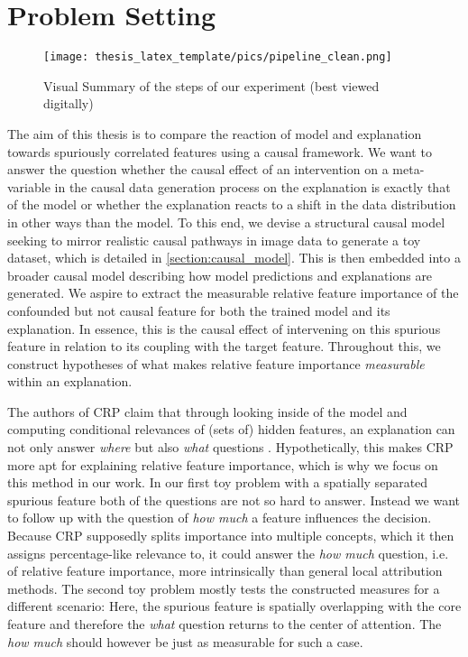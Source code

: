 \chapter{Problem Setting}\label{chapter:problem_setting}

\begin{figure}[t!]
    \advance\leftskip-2.3cm
    \texttt{[image: thesis\_latex\_template/pics/pipeline\_clean.png]}%
    \caption[Pipeline]{Visual Summary of the steps of our experiment (best viewed digitally)}
    \label{fig:pipeline}
\end{figure}

The aim of this thesis is to compare the reaction of model and explanation towards spuriously correlated features using a causal framework.
We want to answer the question whether the causal effect of an intervention on a meta-variable in the causal data generation process on the explanation is exactly that of the model or whether the explanation reacts to a shift in the data distribution in other ways than the model. 
To this end, we devise a structural causal model seeking to mirror realistic causal pathways in image data to generate a toy dataset, which is detailed in \autoref{section:causal_model}. This is then embedded into a broader causal model describing how model predictions and explanations are generated.
We aspire to extract the measurable relative feature importance of the confounded but not causal feature for both the trained model and its explanation. In essence, this is the causal effect of intervening on this spurious feature in relation to its coupling with the target feature. 
Throughout this, we construct hypotheses of what makes relative feature importance \textit{measurable} within an explanation.

The authors of CRP claim that through looking inside of the model and computing conditional relevances of (sets of) hidden features, an explanation can not only answer \textit{where} but also \textit{what} questions \cite{Achtibat2022}. Hypothetically, this makes CRP more apt for explaining relative feature importance, which is why we focus on this method in our work.
In our first toy problem with a spatially separated spurious feature both of the questions are not so hard to answer. Instead we want to follow up with the question of \textit{how much} a feature influences the decision. Because CRP supposedly splits importance into multiple concepts, which it then assigns percentage-like relevance to, it could answer the \textit{how much} question, i.e. of relative feature importance, more intrinsically than general local attribution methods. The second toy problem mostly tests the constructed measures for a different scenario: Here, the spurious feature is spatially overlapping with the core feature and therefore the \textit{what} question returns to the center of attention. The \textit{how much} should however be just as measurable for such a case.

